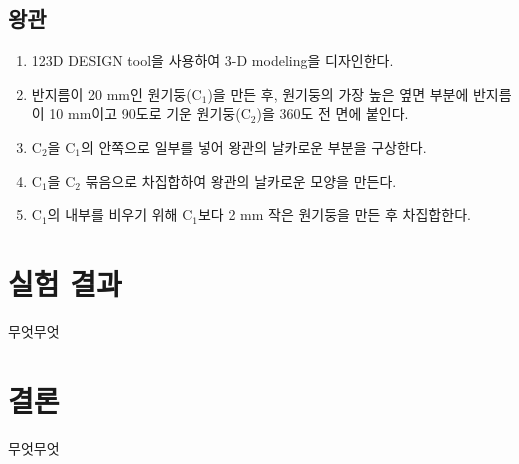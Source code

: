 \documentclass[a4paper, 10pt, nanum]{CSUniSchoolLabReport}
\begin{document}
\subsection{왕관}

\begin{enumerate}[label=\arabic*.]
	\item 123D DESIGN tool을 사용하여 3-D modeling을 디자인한다.
	\item 반지름이 20 mm인 원기둥(C$_1$)을 만든 후, 원기둥의 가장 높은 옆면 부분에 반지름이 10 mm이고 90도로 기운 원기둥(C$_2$)을 360도 전 면에 붙인다.
	\item C$_2$을 C$_1$의 안쪽으로 일부를 넣어 왕관의 날카로운 부분을 구상한다.
	\item C$_1$을 C$_2$ 묶음으로 차집합하여 왕관의 날카로운 모양을 만든다.
	\item C$_1$의 내부를 비우기 위해 C$_1$보다 2 mm 작은 원기둥을 만든 후 차집합한다.
\end{enumerate}


\section{실험 결과}

	무엇무엇



\section{결론}

	무엇무엇



\end{document}
